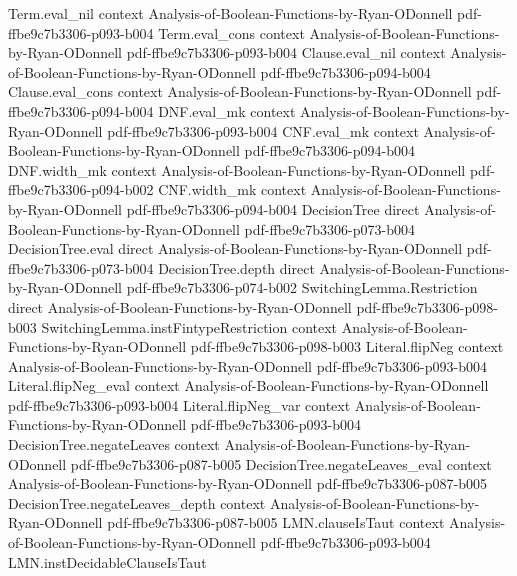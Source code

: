 \begin{theorem}
\proofstep
  {Term.eval_nil}
  {context}
  {Analysis-of-Boolean-Functions-by-Ryan-ODonnell}
  {pdf-ffbe9c7b3306-p093-b004}
\proofstep
  {Term.eval_cons}
  {context}
  {Analysis-of-Boolean-Functions-by-Ryan-ODonnell}
  {pdf-ffbe9c7b3306-p093-b004}
\proofstep
  {Clause.eval_nil}
  {context}
  {Analysis-of-Boolean-Functions-by-Ryan-ODonnell}
  {pdf-ffbe9c7b3306-p094-b004}
\proofstep
  {Clause.eval_cons}
  {context}
  {Analysis-of-Boolean-Functions-by-Ryan-ODonnell}
  {pdf-ffbe9c7b3306-p094-b004}
\proofstep
  {DNF.eval_mk}
  {context}
  {Analysis-of-Boolean-Functions-by-Ryan-ODonnell}
  {pdf-ffbe9c7b3306-p093-b004}
\proofstep
  {CNF.eval_mk}
  {context}
  {Analysis-of-Boolean-Functions-by-Ryan-ODonnell}
  {pdf-ffbe9c7b3306-p094-b004}
\proofstep
  {DNF.width_mk}
  {context}
  {Analysis-of-Boolean-Functions-by-Ryan-ODonnell}
  {pdf-ffbe9c7b3306-p094-b002}
\proofstep
  {CNF.width_mk}
  {context}
  {Analysis-of-Boolean-Functions-by-Ryan-ODonnell}
  {pdf-ffbe9c7b3306-p094-b004}
\proofstep
  {DecisionTree}
  {direct}
  {Analysis-of-Boolean-Functions-by-Ryan-ODonnell}
  {pdf-ffbe9c7b3306-p073-b004}
\proofstep
  {DecisionTree.eval}
  {direct}
  {Analysis-of-Boolean-Functions-by-Ryan-ODonnell}
  {pdf-ffbe9c7b3306-p073-b004}
\proofstep
  {DecisionTree.depth}
  {direct}
  {Analysis-of-Boolean-Functions-by-Ryan-ODonnell}
  {pdf-ffbe9c7b3306-p074-b002}
\proofstep
  {SwitchingLemma.Restriction}
  {direct}
  {Analysis-of-Boolean-Functions-by-Ryan-ODonnell}
  {pdf-ffbe9c7b3306-p098-b003}
\proofstep
  {SwitchingLemma.instFintypeRestriction}
  {context}
  {Analysis-of-Boolean-Functions-by-Ryan-ODonnell}
  {pdf-ffbe9c7b3306-p098-b003}
\proofstep
  {Literal.flipNeg}
  {context}
  {Analysis-of-Boolean-Functions-by-Ryan-ODonnell}
  {pdf-ffbe9c7b3306-p093-b004}
\proofstep
  {Literal.flipNeg_eval}
  {context}
  {Analysis-of-Boolean-Functions-by-Ryan-ODonnell}
  {pdf-ffbe9c7b3306-p093-b004}
\proofstep
  {Literal.flipNeg_var}
  {context}
  {Analysis-of-Boolean-Functions-by-Ryan-ODonnell}
  {pdf-ffbe9c7b3306-p093-b004}
\proofstep
  {DecisionTree.negateLeaves}
  {context}
  {Analysis-of-Boolean-Functions-by-Ryan-ODonnell}
  {pdf-ffbe9c7b3306-p087-b005}
\proofstep
  {DecisionTree.negateLeaves_eval}
  {context}
  {Analysis-of-Boolean-Functions-by-Ryan-ODonnell}
  {pdf-ffbe9c7b3306-p087-b005}
\proofstep
  {DecisionTree.negateLeaves_depth}
  {context}
  {Analysis-of-Boolean-Functions-by-Ryan-ODonnell}
  {pdf-ffbe9c7b3306-p087-b005}
\proofstep
  {LMN.clauseIsTaut}
  {context}
  {Analysis-of-Boolean-Functions-by-Ryan-ODonnell}
  {pdf-ffbe9c7b3306-p093-b004}
\proofstep
  {LMN.instDecidableClauseIsTaut}

\end{theorem}
